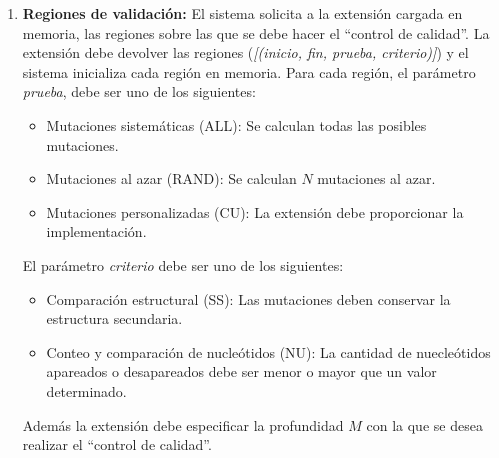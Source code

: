 \documentclass[10pt,a4paper]{article}
\begin{document}
\begin{enumerate}
    \item \textbf{Regiones de validaci\'on:}
    El sistema solicita a la extensi\'on cargada en memoria, las regiones sobre las que se debe hacer el ``control de calidad''. La extensi\'on debe devolver las regiones (\textit{[(inicio, fin, prueba, criterio)]}) y el sistema inicializa cada regi\'on en memoria. Para cada regi\'on, el par\'ametro \textit{prueba}, debe ser uno de los siguientes:
      \begin{itemize}
        \item Mutaciones sistem\'aticas (ALL): Se calculan todas las posibles mutaciones.
	\item Mutaciones al azar (RAND): Se calculan $N$ mutaciones al azar.
	\item Mutaciones personalizadas (CU): La extensi\'on debe proporcionar la implementaci\'on.
      \end{itemize}    
    El par\'ametro \textit{criterio} debe ser uno de los siguientes:
      \begin{itemize}
        \item Comparaci\'on estructural (SS): Las mutaciones deben conservar la estructura secundaria.
	\item Conteo y comparaci\'on de nucle\'otidos (NU): La cantidad de nuecle\'otidos apareados o desapareados debe ser menor o mayor que un valor determinado.
      \end{itemize}
    
    Adem\'as la extensi\'on debe especificar la profundidad $M$ con la que se desea realizar el ``control de calidad''.    
  \end{enumerate}
\end{document}
